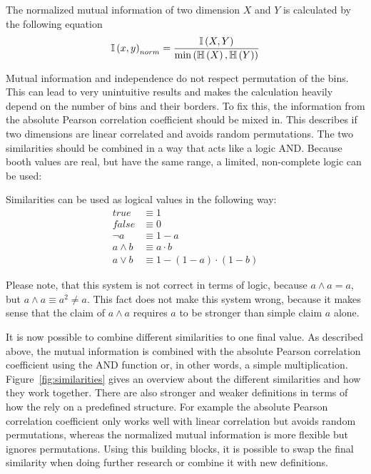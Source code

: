 \begin{envdef}
	The normalized mutual information of two dimension $X$ and $Y$ is calculated by the following equation
	\begin{equation}
		\mathbb{I}\left(x,y\right)_{norm} = \frac{\mathbb{I}\left(X,Y\right)}{\min{\left( \mathbb{H}\left(X\right), \mathbb{H}\left(Y\right) \right)}}
	\end{equation}
\end{envdef}

Mutual information and independence do not respect permutation of the bins. This can lead to very unintuitive results and makes the calculation heavily depend on the number of bins and their borders. To fix this, the information from the absolute Pearson correlation coefficient should be mixed in. This describes if two dimensions are linear correlated and avoids random permutations. The two similarities should be combined in a way that acts like a logic AND. Because booth values are real, but have the same range, a limited, non-complete logic can be used:

\begin{envdef}
	Similarities can be used as logical values in the following way:
	\begin{align}
		true &\equiv 1\\
		false &\equiv 0\\
		\neg a &\equiv 1 - a\\
		a \wedge b &\equiv a \cdot b\\
		a \vee b &\equiv 1 - (1 - a) \cdot (1 - b)
	\end{align}
\end{envdef}

Please note, that this system is not correct in terms of logic, because $a \wedge a = a$, but $a \wedge a \equiv a^2 \neq a$. This fact does not make this system wrong, because it makes sense that the claim of $a \wedge a$ requires $a$ to be stronger than simple claim $a$ alone.

It is now possible to combine different similarities to one final value. As described above, the mutual information is combined with the absolute Pearson correlation coefficient using the AND function or, in other words, a simple multiplication. Figure~\ref{fig:similarities} gives an overview about the different similarities and how they work together. There are also stronger and weaker definitions in terms of how the rely on a predefined structure. For example the absolute Pearson correlation coefficient only works well with linear correlation but avoids random permutations, whereas the normalized mutual information is more flexible but ignores permutations. Using this building blocks, it is possible to swap the final similarity when doing further research or combine it with new definitions.

